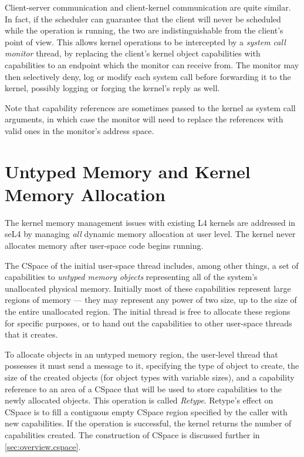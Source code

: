 Client-server communication and client-kernel communication are quite similar.
In fact, if the scheduler can guarantee that the client will never be
scheduled while the operation is running, the two are indistinguishable from
the client's point of view. This allows kernel operations to be intercepted by
a \emph{system call monitor} thread, by replacing the client's kernel object
capabilities with capabilities to an endpoint which the monitor can receive
from. The monitor may then selectively deny, log or modify each system call
before forwarding it to the kernel, possibly logging or forging the kernel's
reply as well.

Note that capability references are sometimes passed to the kernel as system
call arguments, in which case the monitor will need to replace the references
with valid ones in the monitor's address space.

\section{Untyped Memory and Kernel Memory Allocation}\label{sec:sel4:alloc}

The kernel memory management issues with existing L4 kernels are addressed in
seL4 by managing \emph{all} dynamic memory allocation at user level. The
kernel never allocates memory after user-space code begins running.

The CSpace of the initial user-space thread includes, among other things, a
set of capabilities to \emph{untyped memory objects} representing all of the
system's unallocated physical memory. Initially most of these capabilities
represent large regions of memory --- they may represent any power of two
size, up to the size of the entire unallocated region. The initial thread is
free to allocate these regions for specific purposes, or to hand out the
capabilities to other user-space threads that it creates.

To allocate objects in an untyped memory region, the user-level thread that
possesses it must send a message to it, specifying the type of object to
create, the size of the created objects (for object types with variable
sizes), and a capability reference to an area of a CSpace that will be used to
store capabilities to the newly allocated objects. This operation is called
\emph{Retype}. Retype's effect on CSpace is to fill a contiguous empty CSpace
region specified by the caller with new capabilities. If the operation is
successful, the kernel returns the number of capabilities created. The
construction of CSpace is discussed further in \autoref{sec:overview.cspace}.

